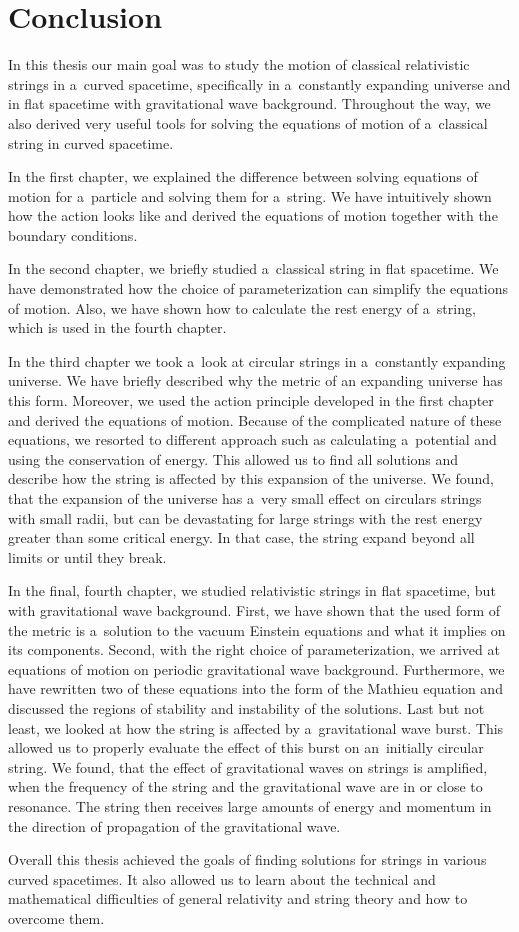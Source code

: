 \chapter*{Conclusion}

In this thesis our main goal was to study the motion of classical relativistic strings in a~curved spacetime, specifically in a~constantly expanding universe and in flat spacetime with gravitational wave background. Throughout the way, we also derived very useful tools for solving the equations of motion of a~classical string in curved spacetime.

In the first chapter, we explained the difference between solving equations of motion for a~particle and solving them for a~string. We have intuitively shown how the action looks like and derived the equations of motion together with the boundary conditions. 

In the second chapter, we briefly studied a~classical string in flat spacetime. We have demonstrated how the choice of parameterization can simplify the equations of motion. Also, we have shown how to calculate the rest energy of a~string, which is used in the fourth chapter.

In the third chapter we took a~look at circular strings in a~constantly expanding universe. We have briefly described why the metric of an expanding universe has this form. Moreover, we used the action principle developed in the first chapter and derived the equations of motion. Because of the complicated nature of these equations, we resorted to different approach such as calculating a~potential and using the conservation of energy. This allowed us to find all solutions and describe how the string is affected by this expansion of the universe. We found, that the expansion of the universe has a~very small effect on circulars strings with small radii, but can be devastating for large strings with the rest energy greater than some critical energy. In that case, the string expand beyond all limits or until they break. 

In the final, fourth chapter, we studied relativistic strings in flat spacetime, but with gravitational wave background. First, we have shown that the used form of the metric is a~solution to the vacuum Einstein equations and what it implies on its components. Second, with the right choice of parameterization, we arrived at equations of motion on periodic gravitational wave background. Furthermore, we have rewritten two of these equations into the form of the Mathieu equation and discussed the regions of stability and instability of the solutions. Last but not least, we looked at how the string is affected by a~gravitational wave burst. This allowed us to properly evaluate the effect of this burst on an~initially circular string. We found, that the effect of gravitational waves on strings is amplified, when the frequency of the string and the gravitational wave are in or close to resonance. The string then receives large amounts of energy and momentum in the direction of propagation of the gravitational wave.

Overall this thesis achieved the goals of finding solutions for strings in various curved spacetimes. It also allowed us to learn about the technical and mathematical difficulties of general relativity and string theory and how to overcome them.



